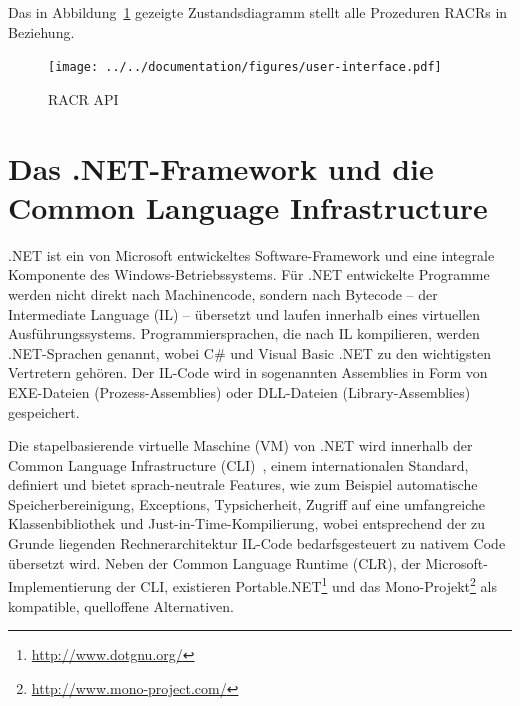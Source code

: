 Das in Abbildung~\ref{fig:racr-api} gezeigte Zustandsdiagramm stellt alle Prozeduren RACRs in Beziehung.

\begin{figure}[h!]
	\centering
	\texttt{[image: ../../documentation/figures/user-interface.pdf]}
	\caption[Die RACR API]{RACR API~\cite{Buerger2012}}
	\label{fig:racr-api}
\end{figure}


\section{Das .NET-Framework und die Common Language Infrastructure}\label{sec:cli}

.NET ist ein von Microsoft entwickeltes Software-Framework und eine integrale Komponente des Windows-Betriebssystems. Für .NET entwickelte Programme werden nicht direkt nach Machinencode, sondern nach Bytecode – der Intermediate Language (IL) – übersetzt und laufen innerhalb eines virtuellen Ausführungssystems. Programmiersprachen, die nach IL kompilieren, werden .NET-Sprachen genannt, wobei C\# und Visual Basic .NET zu den wichtigsten Vertretern gehören. Der IL-Code wird in sogenannten Assemblies in Form von EXE-Dateien (Prozess-Assemblies) oder DLL-Dateien (Library-Assemblies) gespeichert.

Die stapelbasierende virtuelle Maschine (VM) von .NET wird innerhalb der Common Language Infrastructure (CLI)~\cite{ECMA2012}, einem internationalen Standard, definiert und bietet sprach-neutrale Features, wie zum Beispiel automatische Speicherbereinigung, Exceptions, Typsicherheit, Zugriff auf eine umfangreiche Klassenbibliothek und Just-in-Time-Kompilierung, wobei entsprechend der zu Grunde liegenden Rechnerarchitektur IL-Code bedarfsgesteuert zu nativem Code übersetzt wird. Neben der Common Language Runtime (CLR), der Microsoft-Implementierung der CLI, existieren Portable.NET\footnote{\url{http://www.dotgnu.org/}} und das Mono-Projekt\footnote{\url{http://www.mono-project.com/}} als kompatible, quelloffene Alternativen.


